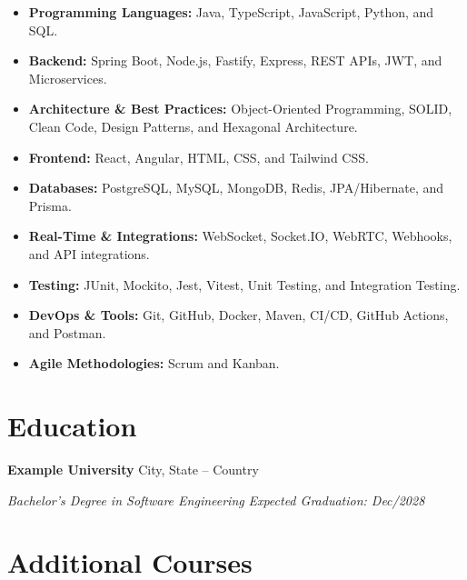\documentclass[a4paper,10pt]{article}
\begin{document}
\begin{itemize}[itemsep=0.03em, topsep=0.08em]

    \item \textbf{Programming Languages:}
    Java, TypeScript, JavaScript, Python, and SQL.

    \item \textbf{Backend:}
    Spring Boot, Node.js, Fastify, Express, REST APIs, JWT, and Microservices.

    \item \textbf{Architecture \& Best Practices:}
    Object-Oriented Programming, SOLID, Clean Code, Design Patterns, and Hexagonal Architecture.

    \item \textbf{Frontend:}
    React, Angular, HTML, CSS, and Tailwind CSS.

    \item \textbf{Databases:}
    PostgreSQL, MySQL, MongoDB, Redis, JPA/Hibernate, and Prisma.

    \item \textbf{Real-Time \& Integrations:}
    WebSocket, Socket.IO, WebRTC, Webhooks, and API integrations.

    \item \textbf{Testing:}
    JUnit, Mockito, Jest, Vitest, Unit Testing, and Integration Testing.

    \item \textbf{DevOps \& Tools:}
    Git, GitHub, Docker, Maven, CI/CD, GitHub Actions, and Postman.

    \item \textbf{Agile Methodologies:}
    Scrum and Kanban.

\end{itemize}


\section{Education}

\textbf{Example University}
\hfill
City, State -- Country

\textit{Bachelor's Degree in Software Engineering}
\hfill
\textit{Expected Graduation: Dec/2028}


\section{Additional Courses}
\end{document}
